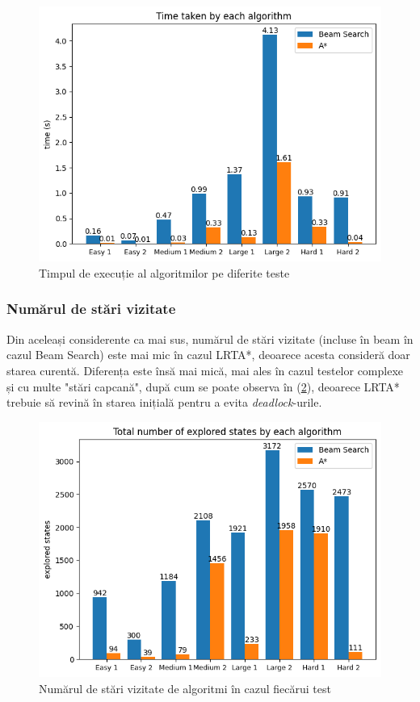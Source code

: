 \documentclass{article}
\begin{document}
\begin{figure}
    \includegraphics[scale=0.8]{solution/time.png}
    \caption{Timpul de execuție al algoritmilor pe diferite teste}
    \label{fig:time}
\end{figure}

\subsubsection*{Numărul de stări vizitate}
Din aceleași considerente ca mai sus, numărul de stări vizitate (incluse în beam
în cazul Beam Search) este mai mic în cazul LRTA*, deoarece acesta consideră 
doar starea curentă. Diferența este însă mai mică, mai ales în cazul testelor 
complexe și cu multe "stări capcană", după cum se poate observa în 
(\ref{fig:states}), deoarece LRTA* trebuie să revină în starea inițială pentru
a evita \textit{deadlock}-urile.

\begin{figure}
    \includegraphics[scale=0.8]{solution/states.png}
    \caption{Numărul de stări vizitate de algoritmi în cazul fiecărui test}
    \label{fig:states}
\end{figure}
\end{document}

